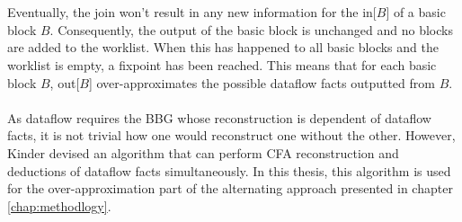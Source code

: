 \documentclass{kththesis}
\begin{document}
\\ \\
Eventually, the join won't result in any new information for the in[$B$] of a basic block $B$. Consequently, the output of the basic block is unchanged and no blocks are added to the worklist. When this has happened to all basic blocks and the worklist is empty, a fixpoint has been reached. This means that for each basic block $B$, out[$B$] over-approximates the possible dataflow facts outputted from $B$.
\\ \\
As dataflow requires the BBG whose reconstruction is dependent of dataflow facts, it is not trivial how one would reconstruct one without the other. However, Kinder\cite{Jakstab} devised an algorithm that can perform CFA reconstruction and deductions of dataflow facts simultaneously. In this thesis, this algorithm is used for the over-approximation part of the alternating approach presented in chapter \ref{chap:methodlogy}.
\end{document}
